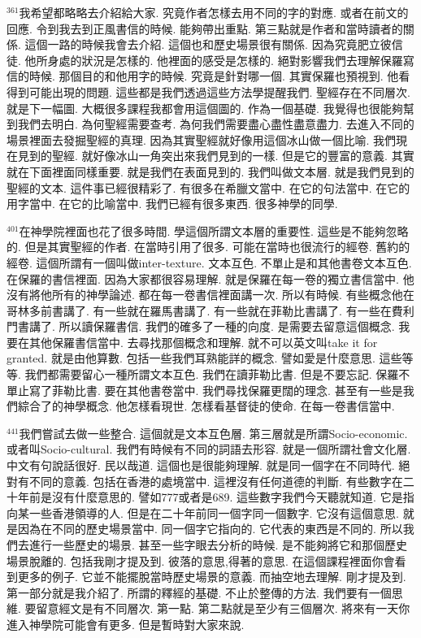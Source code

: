 \documentclass{book}
\begin{document}
$^{361}$我希望都略略去介紹給大家.
究竟作者怎樣去用不同的字的對應.
或者在前文的回應.
令到我去到正風書信的時候.
能夠帶出重點.
第三點就是作者和當時讀者的關係.
這個一路的時候我會去介紹.
這個也和歷史場景很有關係.
因為究竟肥立彼信徒.
他所身處的狀況是怎樣的.
他裡面的感受是怎樣的.
絕對影響我們去理解保羅寫信的時候.
那個目的和他用字的時候.
究竟是針對哪一個.
其實保羅也預視到.
他看得到可能出現的問題.
這些都是我們透過這些方法學提醒我們.
聖經存在不同層次.
就是下一幅圖.
大概很多課程我都會用這個圖的.
作為一個基礎.
我覺得也很能夠幫到我們去明白.
為何聖經需要查考.
為何我們需要盡心盡性盡意盡力.
去進入不同的場景裡面去發掘聖經的真理.
因為其實聖經就好像用這個冰山做一個比喻.
我們現在見到的聖經.
就好像冰山一角突出來我們見到的一樣.
但是它的豐富的意義.
其實就在下面裡面同樣重要.
就是我們在表面見到的.
我們叫做文本層.
就是我們見到的聖經的文本.
這件事已經很精彩了.
有很多在希臘文當中.
在它的句法當中.
在它的用字當中.
在它的比喻當中.
我們已經有很多東西.
很多神學的同學.

$^{401}$在神學院裡面也花了很多時間.
學這個所謂文本層的重要性.
這些是不能夠忽略的.
但是其實聖經的作者.
在當時引用了很多.
可能在當時也很流行的經卷.
舊約的經卷.
這個所謂有一個叫做inter-texture.
文本互色.
不單止是和其他書卷文本互色.
在保羅的書信裡面.
因為大家都很容易理解.
就是保羅在每一卷的獨立書信當中.
他沒有將他所有的神學論述.
都在每一卷書信裡面講一次.
所以有時候.
有些概念他在哥林多前書講了.
有一些就在羅馬書講了.
有一些就在菲勒比書講了.
有一些在費利門書講了.
所以讀保羅書信.
我們的確多了一種的向度.
是需要去留意這個概念.
我要在其他保羅書信當中.
去尋找那個概念和理解.
就不可以英文叫take it for granted.
就是由他算數.
包括一些我們耳熟能詳的概念.
譬如愛是什麼意思.
這些等等.
我們都需要留心一種所謂文本互色.
我們在讀菲勒比書.
但是不要忘記.
保羅不單止寫了菲勒比書.
要在其他書卷當中.
我們尋找保羅更闊的理念.
甚至有一些是我們綜合了的神學概念.
他怎樣看現世.
怎樣看基督徒的使命.
在每一卷書信當中.

$^{441}$我們嘗試去做一些整合.
這個就是文本互色層.
第三層就是所謂Socio-economic.
或者叫Socio-cultural.
我們有時候有不同的詞語去形容.
就是一個所謂社會文化層.
中文有句說話很好.
民以哉道.
這個也是很能夠理解.
就是同一個字在不同時代.
絕對有不同的意義.
包括在香港的處境當中.
這裡沒有任何道德的判斷.
有些數字在二十年前是沒有什麼意思的.
譬如777或者是689.
這些數字我們今天聽就知道.
它是指向某一些香港領導的人.
但是在二十年前同一個字同一個數字.
它沒有這個意思.
就是因為在不同的歷史場景當中.
同一個字它指向的.
它代表的東西是不同的.
所以我們去進行一些歷史的場景.
甚至一些字眼去分析的時候.
是不能夠將它和那個歷史場景脫離的.
包括我剛才提及到.
彼落的意思,得著的意思.
在這個課程裡面你會看到更多的例子.
它並不能擺脫當時歷史場景的意義.
而抽空地去理解.
剛才提及到.
第一部分就是我介紹了.
所謂的釋經的基礎.
不止於整傳的方法.
我們要有一個思維.
要留意經文是有不同層次.
第一點.
第二點就是至少有三個層次.
將來有一天你進入神學院可能會有更多.
但是暫時對大家來說.
\end{document}
